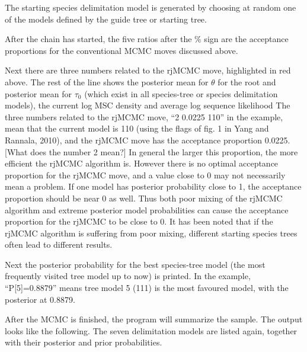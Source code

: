 \documentclass{book}
\numberwithin{equation}{section} \renewcommand{\baselinestretch}{0.55}
\begin{document}
The starting species delimitation model is generated by choosing at
random one of the models defined by the guide tree or starting tree.

After the chain has started, the five ratios after the \% sign are the
acceptance proportions for the conventional MCMC moves discussed
above.

Next there are three numbers related to the rjMCMC move, highlighted
in red above.  The rest of the line shows the posterior mean for
$\theta$ for the root and posterior mean for $\tau_0$ (which exist in
all species-tree or species delimitation models), the current log MSC
density and average log sequence likelihood The three numbers related
to the rjMCMC move, ``2 0.0225 110'' in the example, mean that the
current model is 110 (using the flags of fig.  1 in Yang and Rannala,
2010), and the rjMCMC move has the acceptance proportion 0.0225.
[What does the number 2 mean?]  In general the larger this proportion,
the more efficient the rjMCMC algorithm is.  However there is no
optimal acceptance proportion for the rjMCMC move, and a value close
to 0 may not necessarily mean a problem.  If one model has posterior
probability close to 1, the acceptance proportion should be near 0 as
well.  Thus both poor mixing of the rjMCMC algorithm and extreme
posterior model probabilities can cause the acceptance proportion for
the rjMCMC to be close to 0.  It has been noted that if the rjMCMC
algorithm is suffering from poor mixing, different starting species
trees often lead to different results.

Next the posterior probability for the best species-tree model (the
most frequently visited tree model up to now) is printed.  In the
example, ``P[5]=0.8879'' means tree model 5 (111) is the most favoured
model, with the posterior at 0.8879.

After the MCMC is finished, the program will summarize the sample.
The output looks like the following.  The seven delimitation models
are listed again, together with their posterior and prior
probabilities.
\end{document}
